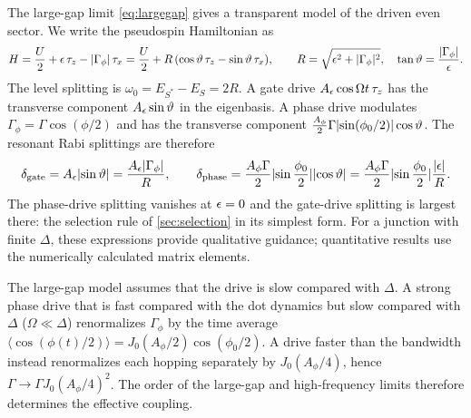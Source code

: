 The large-gap limit \eqref{eq:largegap} gives a transparent model of the driven even sector.
We write the pseudospin Hamiltonian as
\begin{equation}\label{eq:pseudospin}
  H=\frac U2+\epsilon\,\tau_z-\lvert \Gamma_\phi\rvert\,\tau_x
   =\frac U2+R\,(\cos\vartheta\,\tau_z-\sin\vartheta\,\tau_x),\qquad
  R=\sqrt{\epsilon^2+\lvert \Gamma_\phi\rvert^2},\quad \tan\vartheta=\frac{\lvert \Gamma_\phi\rvert}{\epsilon}.
\end{equation}
The level splitting is $\omega_0=E_{S^*}-E_S=2R$. A gate drive $A_\epsilon\cos\Omega t\,\tau_z$ has
the transverse component $A_\epsilon\sin\vartheta$ in the eigenbasis. A phase drive modulates
$\Gamma_\phi=\Gamma\cos(\phi/2)$ and has the transverse component
$\tfrac{A_\phi}2\Gamma\lvert \sin(\phi_0/2)\rvert\cos\vartheta$. The resonant Rabi splittings are
therefore
\begin{equation}\label{eq:largegap-rabi}
  \delta_{\mathrm{gate}}=A_\epsilon\lvert \sin\vartheta\rvert=\frac{A_\epsilon\lvert \Gamma_\phi\rvert}{R},\qquad
  \delta_{\mathrm{phase}}=\frac{A_\phi\Gamma}2\lvert \sin\frac{\phi_0}2\rvert\lvert \cos\vartheta\rvert
  =\frac{A_\phi\Gamma}{2}\lvert \sin\frac{\phi_0}2\rvert\frac{\lvert \epsilon\rvert}{R}.
\end{equation}
The phase-drive splitting vanishes at $\epsilon=0$ and the gate-drive splitting is largest
there: the selection rule of \cref{sec:selection} in its simplest form. For a junction with
finite $\Delta$, these expressions provide qualitative guidance; quantitative results use
the numerically calculated matrix elements.

\begin{caution}
The large-gap model assumes that the drive is slow compared with $\Delta$. A strong phase
drive that is fast compared with the dot dynamics but slow compared with $\Delta$
($\Omega\ll\Delta$) renormalizes $\Gamma_\phi$ by the time average
$\langle\cos(\phi(t)/2)\rangle=J_0(A_\phi/2)\cos(\phi_0/2)$. A drive faster than the
bandwidth instead renormalizes each hopping separately by $J_0(A_\phi/4)$, hence
$\Gamma\to\Gamma J_0(A_\phi/4)^2$. The order of the large-gap and high-frequency limits
therefore determines the effective coupling.
\end{caution}
